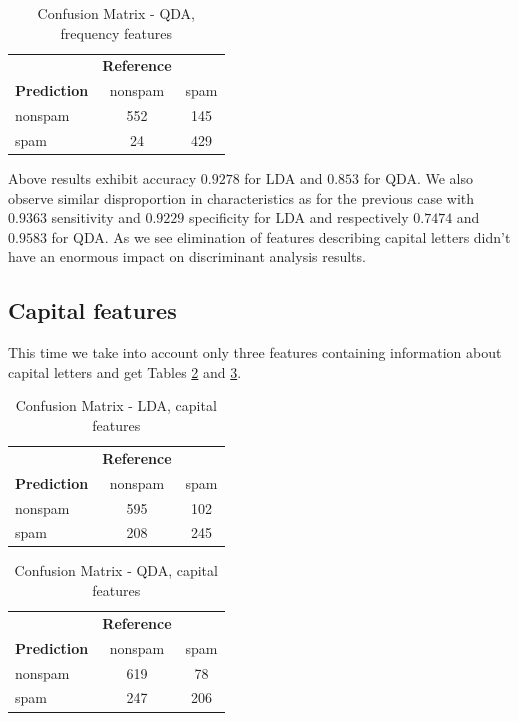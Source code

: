 \documentclass{article}\usepackage[]{graphicx}\usepackage[]{xcolor}
\begin{document}
	\begin{table}[h]
		\centering
		\begin{tabular}{lcc}
			& \textbf{Reference} & \\
			\textbf{Prediction} & nonspam & spam \\
			nonspam & 552 & 145 \\
			spam & 24 & 429 \\
		\end{tabular}
		\caption{Confusion Matrix - QDA, frequency features}
		\label{tab:confusion_matrix_qda2}
	\end{table}
	
Above results exhibit accuracy $0.9278$ for LDA and $0.853$ for QDA. We also 
observe similar disproportion in characteristics as for the previous case with 
$0.9363$ sensitivity and $0.9229$ specificity for LDA and respectively $0.7474$ 
and $0.9583$ for QDA. As we see elimination of features describing capital letters 
didn't have an enormous impact on discriminant analysis results.

\subsection*{Capital features}

This time we take into account only three features containing information about capital 
letters and get Tables \ref{tab:confusion_matrix_lda3} and \ref{tab:confusion_matrix_qda3}.

	\begin{table}[h]
		\centering
		\begin{tabular}{lcc}
			& \textbf{Reference} & \\
			\textbf{Prediction} & nonspam & spam \\
			nonspam & 595 & 102 \\
			spam & 208 & 245 \\
		\end{tabular}
		\caption{Confusion Matrix - LDA, capital features}
		\label{tab:confusion_matrix_lda3}
	\end{table}
	
	\begin{table}[h]
		\centering
		\begin{tabular}{lcc}
			& \textbf{Reference} & \\
			\textbf{Prediction} & nonspam & spam \\
			nonspam & 619 & 78 \\
			spam & 247 & 206 \\
		\end{tabular}
		\caption{Confusion Matrix - QDA, capital features}
		\label{tab:confusion_matrix_qda3}
	\end{table}
	 
\end{document}
